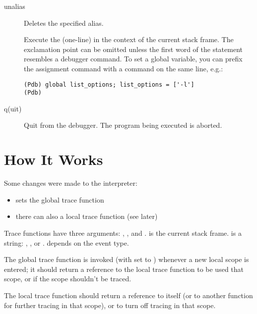 \begin{description}
\item[unalias ]

Deletes the specified alias.

\item[\optional{!}]

Execute the (one-line)  in the context of
the current stack frame.
The exclamation point can be omitted unless the first word
of the statement resembles a debugger command.
To set a global variable, you can prefix the assignment
command with a  command on the same line, e.g.:

\begin{verbatim}
(Pdb) global list_options; list_options = ['-l']
(Pdb)
\end{verbatim}

\item[q(uit)]

Quit from the debugger.
The program being executed is aborted.

\end{description}

\section{How It Works \label{debugger-hooks}}

Some changes were made to the interpreter:

\begin{itemize}
\item {} sets the global trace function
\item there can also a local trace function (see later)
\end{itemize}

Trace functions have three arguments: , , and
.  is the current stack frame.   is a
string: , ,  or
.   depends on the event type.

The global trace function is invoked (with  set to
) whenever a new local scope is entered; it should return
a reference to the local trace function to be used that scope, or
 if the scope shouldn't be traced.

The local trace function should return a reference to itself (or to
another function for further tracing in that scope), or  to
turn off tracing in that scope.

